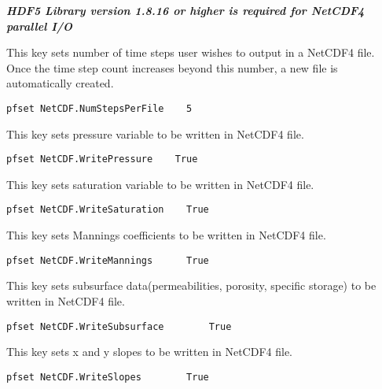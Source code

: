 \textbf{\textit{HDF5 Library version 1.8.16 or higher is required for NetCDF4 parallel I/O}}

{This key sets number of time steps user wishes to output in a NetCDF4 file. Once the time step count increases beyond this number, a new file is automatically created.}
\begin{display}\begin{verbatim}
pfset NetCDF.NumStepsPerFile    5
\end{verbatim}\end{display}

{This key sets pressure variable to be written in NetCDF4 file.}
\begin{display}\begin{verbatim}
pfset NetCDF.WritePressure    True
\end{verbatim}\end{display}

{This key sets saturation variable to be written in NetCDF4 file.}
\begin{display}\begin{verbatim}
pfset NetCDF.WriteSaturation    True
\end{verbatim}\end{display}

{This key sets Mannings coefficients to be written in NetCDF4 file.}
\begin{display}\begin{verbatim}
pfset NetCDF.WriteMannings	    True
\end{verbatim}\end{display}

{This key sets subsurface data(permeabilities, porosity, specific storage) to be written in NetCDF4 file.}
\begin{display}\begin{verbatim}
pfset NetCDF.WriteSubsurface	    True
\end{verbatim}\end{display}

{This key sets x and y slopes to be written in NetCDF4 file.}
\begin{display}\begin{verbatim}
pfset NetCDF.WriteSlopes	    True
\end{verbatim}\end{display}

